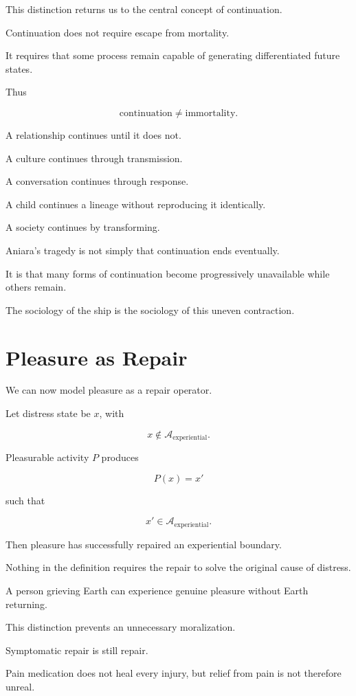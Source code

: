 \documentclass[11pt,oneside]{book}
\theoremstyle{definition}
\theoremstyle{remark}
\newcommand{\A}{\mathcal{A}}
\begin{document}
This distinction returns us to the central concept of continuation.

Continuation does not require escape from mortality.

It requires that some process remain capable of generating differentiated future states.

Thus

\[
\text{continuation}
\neq
\text{immortality}.
\]

A relationship continues until it does not.

A culture continues through transmission.

A conversation continues through response.

A child continues a lineage without reproducing it identically.

A society continues by transforming.

Aniara's tragedy is not simply that continuation ends eventually.

It is that many forms of continuation become progressively unavailable while others remain.

The sociology of the ship is the sociology of this uneven contraction.

\section{Pleasure as Repair}

We can now model pleasure as a repair operator.

Let distress state be \(x\), with

\[
x\notin\A_{\mathrm{experiential}}.
\]

Pleasurable activity \(P\) produces

\[
P(x)=x'
\]

such that

\[
x'\in\A_{\mathrm{experiential}}.
\]

Then pleasure has successfully repaired an experiential boundary.

Nothing in the definition requires the repair to solve the original cause of distress.

A person grieving Earth can experience genuine pleasure without Earth returning.

This distinction prevents an unnecessary moralization.

Symptomatic repair is still repair.

Pain medication does not heal every injury, but relief from pain is not therefore unreal.
\end{document}
